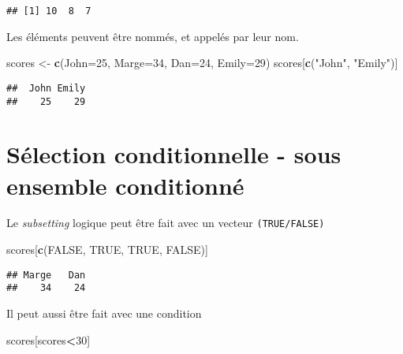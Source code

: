\documentclass[]{book}
\newenvironment{Shaded}{\begin{snugshade}}{\end{snugshade}}
\newcommand{\DataTypeTok}[1]{\textcolor[rgb]{0.13,0.29,0.53}{#1}}
\newcommand{\DecValTok}[1]{\textcolor[rgb]{0.00,0.00,0.81}{#1}}
\newcommand{\KeywordTok}[1]{\textcolor[rgb]{0.13,0.29,0.53}{\textbf{#1}}}
\newcommand{\NormalTok}[1]{#1}
\newcommand{\OperatorTok}[1]{\textcolor[rgb]{0.81,0.36,0.00}{\textbf{#1}}}
\newcommand{\OtherTok}[1]{\textcolor[rgb]{0.56,0.35,0.01}{#1}}
\newcommand{\StringTok}[1]{\textcolor[rgb]{0.31,0.60,0.02}{#1}}
\begin{document}
\begin{verbatim}
## [1] 10  8  7
\end{verbatim}

Les éléments peuvent être nommés, et appelés par leur nom.

\begin{Shaded}
\begin{Highlighting}[]
\NormalTok{scores <-}\StringTok{ }\KeywordTok{c}\NormalTok{(}\DataTypeTok{John=}\DecValTok{25}\NormalTok{, }\DataTypeTok{Marge=}\DecValTok{34}\NormalTok{, }\DataTypeTok{Dan=}\DecValTok{24}\NormalTok{, }\DataTypeTok{Emily=}\DecValTok{29}\NormalTok{)}
\NormalTok{scores[}\KeywordTok{c}\NormalTok{(}\StringTok{"John"}\NormalTok{, }\StringTok{"Emily"}\NormalTok{)]}
\end{Highlighting}
\end{Shaded}

\begin{verbatim}
##  John Emily 
##    25    29
\end{verbatim}

\hypertarget{selection-conditionnelle---sous-ensemble-conditionne-1}{%
\section{Sélection conditionnelle - sous ensemble conditionné}\label{selection-conditionnelle---sous-ensemble-conditionne-1}}

Le \emph{subsetting} logique peut être fait avec un vecteur \texttt{(TRUE/FALSE)}

\begin{Shaded}
\begin{Highlighting}[]
\NormalTok{scores[}\KeywordTok{c}\NormalTok{(}\OtherTok{FALSE}\NormalTok{, }\OtherTok{TRUE}\NormalTok{, }\OtherTok{TRUE}\NormalTok{, }\OtherTok{FALSE}\NormalTok{)]}
\end{Highlighting}
\end{Shaded}

\begin{verbatim}
## Marge   Dan 
##    34    24
\end{verbatim}

Il peut aussi être fait avec une condition

\begin{Shaded}
\begin{Highlighting}[]
\NormalTok{scores[scores}\OperatorTok{<}\DecValTok{30}\NormalTok{]}
\end{Highlighting}
\end{Shaded}
\end{document}
